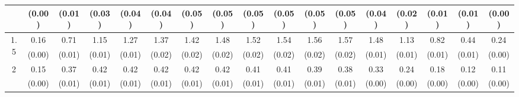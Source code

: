 \documentclass[12pt]{article}  %
\theoremstyle{plain}
\begin{document}
\begin{sidewaystable}[htbp]
\begin{tabular}{ccccccccccccccccc}
                       & (0.00)&   (0.01)& (0.03)& (0.04)& (0.04)& (0.05)& (0.05)& (0.05)& (0.05)&  (0.05)&  (0.05)&  (0.04)&  (0.02)&  (0.01)&  (0.01)& (0.00)\\ \hline                                                                                                                                                                                                                                                                                    
\multirow{2}{*}{1.5}  &  0.16& 0.71 &1.15 & 1.27 & 1.37 &  1.42  & 1.48  & 1.52  & 1.54 & 1.56 & 1.57 & 1.48 & 1.13 & 0.82 & 0.44 & 0.24\\
                      &  (0.00)&   (0.01)& (0.01)& (0.01)& (0.02)& (0.02)& (0.02)& (0.02)& (0.02)&  (0.02)&  (0.02)&  (0.01)&  (0.01)&  (0.01)&  (0.01)& (0.00)\\ \hline                                                                                                                                                                                                                                                                                    
\multirow{2}{*}{2}  &0.15& 0.37& 0.42 & 0.42 & 0.42  & 0.42  & 0.42 &  0.41 &  0.41  &0.39 & 0.38 & 0.33 & 0.24 & 0.18 & 0.12 & 0.11
\\
                      &  (0.00) & (0.01)& (0.01)& (0.01)& (0.01)& (0.01)& (0.01)& (0.01)& (0.01)&  (0.01)&  (0.01) & (0.00) & (0.00) & (0.00) & (0.00) & (0.00)\\ \hline                                                                                                                                                                                                                                                                                    
\end{tabular}
\end{sidewaystable}
\end{document}
